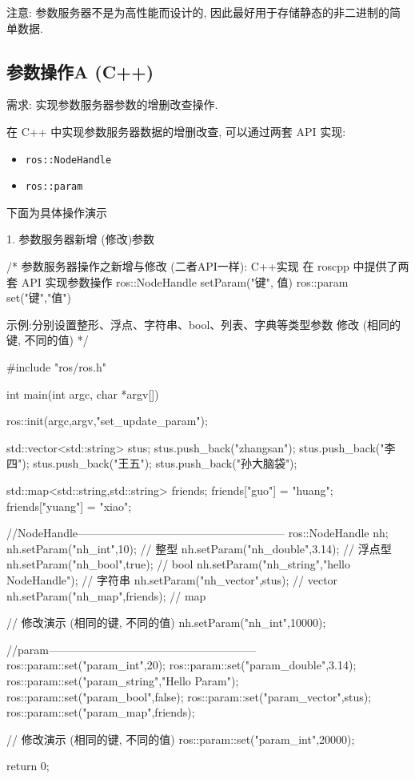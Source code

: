\documentclass[openany, fontset=windowsold]{ctexbook}
\theoremstyle{kaiti}
\theoremstyle{normal}
\begin{document}
注意: 参数服务器不是为高性能而设计的, 因此最好用于存储静态的非二进制的简单数据.

\subsection{参数操作A (C++)}

需求: 实现参数服务器参数的增删改查操作.

在 C++ 中实现参数服务器数据的增删改查, 可以通过两套 API 实现:

\begin{itemize}
  \item \verb|ros::NodeHandle|
  \item \verb|ros::param|
\end{itemize}

下面为具体操作演示

1. 参数服务器新增 (修改)参数

\begin{cpp}
  /*
      参数服务器操作之新增与修改 (二者API一样): C++实现
      在 roscpp 中提供了两套 API 实现参数操作
      ros::NodeHandle
          setParam("键", 值)
      ros::param
          set("键","值")

      示例:分别设置整形、浮点、字符串、bool、列表、字典等类型参数
          修改 (相同的键, 不同的值)
  */

  #include "ros/ros.h"

  int main(int argc, char *argv[])
  {
      ros::init(argc,argv,"set_update_param");

      std::vector<std::string> stus;
      stus.push_back("zhangsan");
      stus.push_back("李四");
      stus.push_back("王五");
      stus.push_back("孙大脑袋");

      std::map<std::string,std::string> friends;
      friends["guo"] = "huang";
      friends["yuang"] = "xiao";

      //NodeHandle--------------------------------------------------------
      ros::NodeHandle nh;
      nh.setParam("nh_int",10); // 整型
      nh.setParam("nh_double",3.14); // 浮点型
      nh.setParam("nh_bool",true); // bool
      nh.setParam("nh_string","hello NodeHandle"); // 字符串
      nh.setParam("nh_vector",stus); // vector
      nh.setParam("nh_map",friends); // map

      // 修改演示 (相同的键, 不同的值)
      nh.setParam("nh_int",10000);

      //param--------------------------------------------------------
      ros::param::set("param_int",20);
      ros::param::set("param_double",3.14);
      ros::param::set("param_string","Hello Param");
      ros::param::set("param_bool",false);
      ros::param::set("param_vector",stus);
      ros::param::set("param_map",friends);

      // 修改演示 (相同的键, 不同的值)
      ros::param::set("param_int",20000);

      return 0;
  }
\end{cpp}
\end{document}
